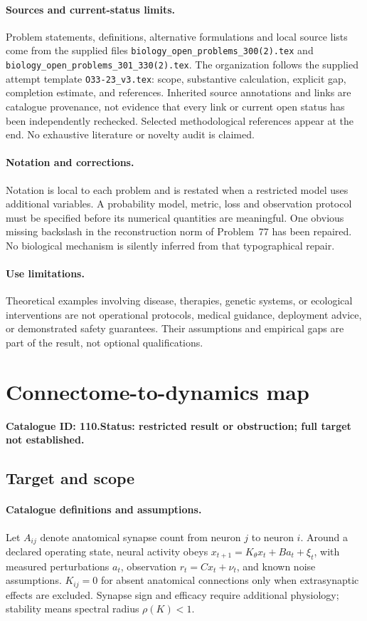 \documentclass[11pt]{article}
\begin{document}
\paragraph{Sources and current-status limits.}
Problem statements, definitions, alternative formulations and local source lists
come from the supplied files
\texttt{biology\_open\_problems\_300(2).tex} and
\texttt{biology\_open\_problems\_301\_330(2).tex}.
The organization follows the supplied attempt template
\texttt{O33-23\_v3.tex}: scope, substantive calculation, explicit gap,
completion estimate, and references. Inherited source annotations and links are
catalogue provenance, not evidence that every link or current open status has
been independently rechecked. Selected methodological references appear at the
end. No exhaustive literature or novelty audit is claimed.

\paragraph{Notation and corrections.}
Notation is local to each problem and is restated when a restricted model uses
additional variables. A probability model, metric, loss and observation protocol
must be specified before its numerical quantities are meaningful. One obvious
missing backslash in the reconstruction norm of Problem~77 has been repaired.
No biological mechanism is silently inferred from that typographical repair.

\paragraph{Use limitations.}
Theoretical examples involving disease, therapies, genetic systems, or ecological
interventions are not operational protocols, medical guidance, deployment advice,
or demonstrated safety guarantees. Their assumptions and empirical gaps are part
of the result, not optional qualifications.

\setcounter{section}{109}
\section{Connectome-to-dynamics map}
\label{prob:110}
\noindent\textbf{Catalogue ID: 110.}\quad \textbf{Status: restricted result or obstruction; full target not established.}
\subsection{Target and scope}
\paragraph{Catalogue definitions and assumptions.}
Let $A_{ij}$ denote anatomical synapse count from neuron $j$ to neuron $i$. Around a declared operating state, neural activity obeys $x_{t+1}=K_\theta x_t+B a_t+\xi_t$, with measured perturbations $a_t$, observation $r_t=Cx_t+\nu_t$, and known noise assumptions. $K_{ij}=0$ for absent anatomical connections only when extrasynaptic effects are excluded. Synapse sign and efficacy require additional physiology; stability means spectral radius $\rho(K)<1$.
\end{document}
